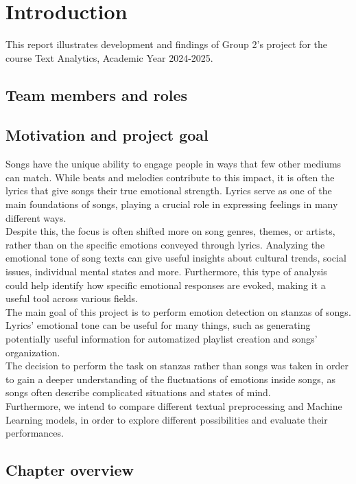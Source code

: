 \chapter*{Introduction}
\label{ch:Introduction}
This report illustrates development and findings of Group 2's project for
the course Text Analytics, Academic Year 2024-2025.

\section*{Team members and roles}


\section*{Motivation and project goal}
Songs have the unique ability to engage people in ways that few other
mediums can match. While beats and melodies contribute to this impact,
it is often the lyrics that give songs their true emotional strength.
Lyrics serve as one of the main foundations of songs, playing
a crucial role in expressing feelings in many different ways.\\

Despite this, the focus is often shifted more on song genres, themes,
or artists, rather than on the specific emotions conveyed through lyrics.
Analyzing the emotional tone of song texts can give useful insights about cultural trends, social issues,
individual mental states and more. Furthermore, this type of analysis
could help identify how specific
emotional responses are evoked, making it a useful tool across various fields.\\

The main goal of this project is to perform emotion
detection on stanzas of songs. Lyrics' emotional tone can be useful
for many things, such as generating potentially useful information for automatized
playlist creation and songs' organization.\\
The decision to perform the task on stanzas rather than songs was taken in order
to gain a deeper understanding of the fluctuations of emotions inside
songs, as songs often describe complicated situations and states of mind.\\




Furthermore, we intend to compare different textual preprocessing and
Machine Learning models, in order to explore different possibilities and
evaluate their performances.

\section*{Chapter overview}
